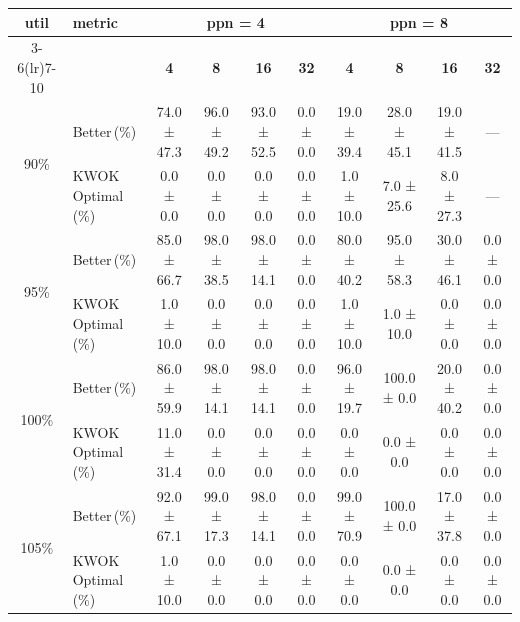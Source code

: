 \begin{tabular}{@{}c l *{8}{c}@{}}
\toprule
\multirow{2}{*}{\textbf{util}} & \multirow{2}{*}{\textbf{metric}} &\multicolumn{4}{c}{\textbf{ppn = 4}} & \multicolumn{4}{c}{\textbf{ppn = 8}}\\
\cmidrule(lr){3-6}\cmidrule(lr){7-10}
 &  & \textbf{4} & \textbf{8} & \textbf{16} & \textbf{32} & \textbf{4} & \textbf{8} & \textbf{16} & \textbf{32}\\
\midrule
\multirow{2}{*}{90\%}
& Better\,(\%) & 74.0 ± 47.3 & 96.0 ± 49.2 & 93.0 ± 52.5 & 0.0 ± 0.0 & 19.0 ± 39.4 & 28.0 ± 45.1 & 19.0 ± 41.5 & \multicolumn{1}{c}{—} \\
& KWOK\,Optimal\,(\%) & 0.0 ± 0.0 & 0.0 ± 0.0 & 0.0 ± 0.0 & 0.0 ± 0.0 & 1.0 ± 10.0 & 7.0 ± 25.6 & 8.0 ± 27.3 & \multicolumn{1}{c}{—} \\
\midrule
\multirow{2}{*}{95\%}
& Better\,(\%) & 85.0 ± 66.7 & 98.0 ± 38.5 & 98.0 ± 14.1 & 0.0 ± 0.0 & 80.0 ± 40.2 & 95.0 ± 58.3 & 30.0 ± 46.1 & 0.0 ± 0.0 \\
& KWOK\,Optimal\,(\%) & 1.0 ± 10.0 & 0.0 ± 0.0 & 0.0 ± 0.0 & 0.0 ± 0.0 & 1.0 ± 10.0 & 1.0 ± 10.0 & 0.0 ± 0.0 & 0.0 ± 0.0 \\
\midrule
\multirow{2}{*}{100\%}
& Better\,(\%) & 86.0 ± 59.9 & 98.0 ± 14.1 & 98.0 ± 14.1 & 0.0 ± 0.0 & 96.0 ± 19.7 & 100.0 ± 0.0 & 20.0 ± 40.2 & 0.0 ± 0.0 \\
& KWOK\,Optimal\,(\%) & 11.0 ± 31.4 & 0.0 ± 0.0 & 0.0 ± 0.0 & 0.0 ± 0.0 & 0.0 ± 0.0 & 0.0 ± 0.0 & 0.0 ± 0.0 & 0.0 ± 0.0 \\
\midrule
\multirow{2}{*}{105\%}
& Better\,(\%) & 92.0 ± 67.1 & 99.0 ± 17.3 & 98.0 ± 14.1 & 0.0 ± 0.0 & 99.0 ± 70.9 & 100.0 ± 0.0 & 17.0 ± 37.8 & 0.0 ± 0.0 \\
& KWOK\,Optimal\,(\%) & 1.0 ± 10.0 & 0.0 ± 0.0 & 0.0 ± 0.0 & 0.0 ± 0.0 & 0.0 ± 0.0 & 0.0 ± 0.0 & 0.0 ± 0.0 & 0.0 ± 0.0 \\
\bottomrule
\end{tabular}
